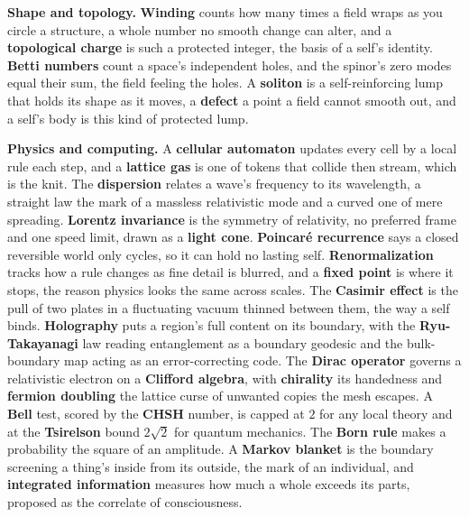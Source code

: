 \textbf{Shape and topology.} \textbf{Winding} counts how many times a field wraps as you circle a structure, a whole number no smooth change can alter, and a \textbf{topological charge} is such a protected integer, the basis of a self's identity. \textbf{Betti numbers} count a space's independent holes, and the spinor's zero modes equal their sum, the field feeling the holes. A \textbf{soliton} is a self-reinforcing lump that holds its shape as it moves, a \textbf{defect} a point a field cannot smooth out, and a self's body is this kind of protected lump.

\textbf{Physics and computing.} A \textbf{cellular automaton} updates every cell by a local rule each step, and a \textbf{lattice gas} is one of tokens that collide then stream, which is the knit. The \textbf{dispersion} relates a wave's frequency to its wavelength, a straight law the mark of a massless relativistic mode and a curved one of mere spreading. \textbf{Lorentz invariance} is the symmetry of relativity, no preferred frame and one speed limit, drawn as a \textbf{light cone}. \textbf{Poincar\'e recurrence} says a closed reversible world only cycles, so it can hold no lasting self. \textbf{Renormalization} tracks how a rule changes as fine detail is blurred, and a \textbf{fixed point} is where it stops, the reason physics looks the same across scales. The \textbf{Casimir effect} is the pull of two plates in a fluctuating vacuum thinned between them, the way a self binds. \textbf{Holography} puts a region's full content on its boundary, with the \textbf{Ryu-Takayanagi} law reading entanglement as a boundary geodesic and the bulk-boundary map acting as an error-correcting code. The \textbf{Dirac operator} governs a relativistic electron on a \textbf{Clifford algebra}, with \textbf{chirality} its handedness and \textbf{fermion doubling} the lattice curse of unwanted copies the mesh escapes. A \textbf{Bell} test, scored by the \textbf{CHSH} number, is capped at $2$ for any local theory and at the \textbf{Tsirelson} bound $2\sqrt 2$ for quantum mechanics. The \textbf{Born rule} makes a probability the square of an amplitude. A \textbf{Markov blanket} is the boundary screening a thing's inside from its outside, the mark of an individual, and \textbf{integrated information} measures how much a whole exceeds its parts, proposed as the correlate of consciousness.

